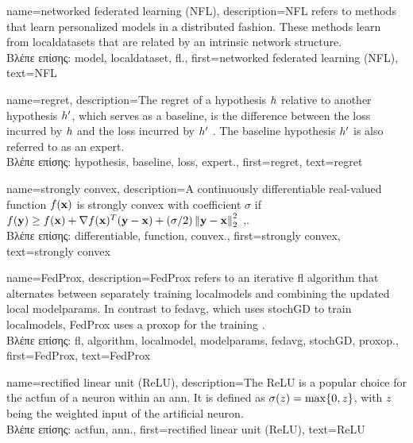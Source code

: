{name={networked federated learning (NFL)},
	description={NFL refers to methods that learn 
		personalized \gls{model}s in a distributed fashion. These methods learn from \gls{localdataset}s 
		that are related by an intrinsic network structure.\\
		\foreignlanguage{greek}{Βλέπε επίσης:} \gls{model}, \gls{localdataset}, \gls{fl}.},
 	first={networked federated learning (NFL)},
	text={NFL} 
}

{name={regret},
	description={The regret of a \gls{hypothesis} $h$ relative to 
		another \gls{hypothesis} $h'$, which serves as a \gls{baseline}, 
		is the difference between the \gls{loss} incurred by $h$ and the \gls{loss} 
		incurred by $h'$ \cite{PredictionLearningGames}. 
		The \gls{baseline} \gls{hypothesis} $h'$ is also referred to as an \gls{expert}.\\
		\foreignlanguage{greek}{Βλέπε επίσης:} \gls{hypothesis}, \gls{baseline}, \gls{loss}, \gls{expert}.},
	first={regret},
	text={regret} 
}

{name={strongly convex},
	description={A continuously \gls{differentiable} real-valued 
		\gls{function} $f({\bf x})$ is strongly \gls{convex} with coefficient 
		$\sigma$ if $f({\bf y}) \geq f({\bf x}) + \nabla f({\bf x})^{T} ({\bf y} - {\bf x}) + (\sigma/2) \left\Vert {{\bf y}- {\bf x}} \right\Vert_{2}^{2}$ 
		\cite{nesterov04},\cite[Sec. B.1.1]{CvxAlgBertsekas}.\\
		\foreignlanguage{greek}{Βλέπε επίσης:} \gls{differentiable}, \gls{function}, \gls{convex}.},
	first={strongly convex},
	text={strongly convex} 
}

{name={FedProx},
	description={FedProx refers to an iterative \gls{fl} \gls{algorithm} that alternates between separately 
		training \gls{localmodel}s and combining the updated 
		local \gls{modelparams}. In contrast to \gls{fedavg}, which uses 
		\gls{stochGD} to train \gls{localmodel}s, FedProx uses a \gls{proxop} for the training \cite{FedProx2020}.\\
		\foreignlanguage{greek}{Βλέπε επίσης:} \gls{fl}, \gls{algorithm}, \gls{localmodel}, \gls{modelparams}, 
		\gls{fedavg}, \gls{stochGD}, \gls{proxop}.}, 
	first={FedProx}, 
	text={FedProx} 
}

{name={rectified linear unit (ReLU)},
	description={The ReLU is 
		a popular choice for the \gls{actfun} of a neuron within an \gls{ann}. It is defined 
		as $\sigma(z) = \max\{0,z\}$, with $z$ being the weighted input of the artificial 
		neuron.\\
		\foreignlanguage{greek}{Βλέπε επίσης:} \gls{actfun}, \gls{ann}.}, 
	first={rectified linear unit (ReLU)}, 
	text={ReLU} 
}


